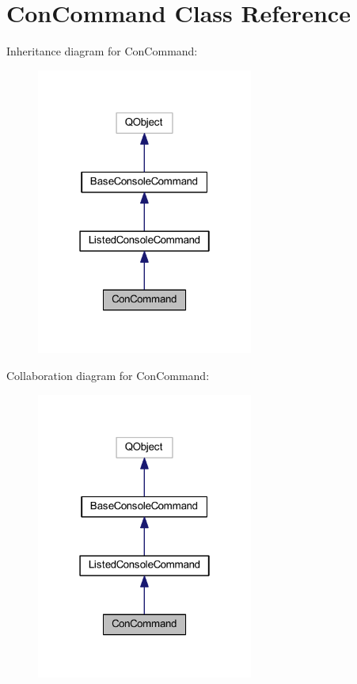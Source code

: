 \hypertarget{class_con_command}{\section{Con\-Command Class Reference}
\label{class_con_command}
}


Inheritance diagram for Con\-Command\-:\nopagebreak
\begin{figure}[H]
\begin{center}
\leavevmode
\includegraphics[width=202pt]{class_con_command__inherit__graph}
\end{center}
\end{figure}


Collaboration diagram for Con\-Command\-:\nopagebreak
\begin{figure}[H]
\begin{center}
\leavevmode
\includegraphics[width=202pt]{class_con_command__coll__graph}
\end{center}
\end{figure}
